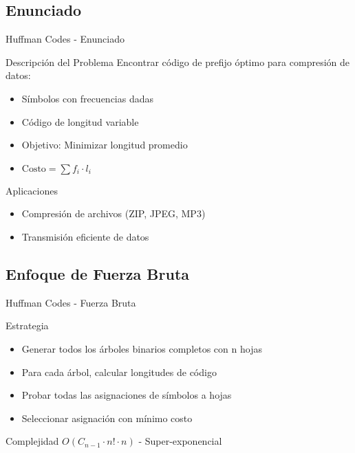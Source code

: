 \documentclass[aspectratio=169]{beamer}
\begin{document}
\subsection{Enunciado}
\begin{frame}{Huffman Codes - Enunciado}
\begin{block}{Descripción del Problema}
Encontrar código de prefijo óptimo para compresión de datos:
\begin{itemize}
\item Símbolos con frecuencias dadas
\item Código de longitud variable
\item Objetivo: Minimizar longitud promedio
\item $\text{Costo} = \sum f_i \cdot l_i$
\end{itemize}
\end{block}

\begin{exampleblock}{Aplicaciones}
\begin{itemize}
\item Compresión de archivos (ZIP, JPEG, MP3)
\item Transmisión eficiente de datos
\end{itemize}
\end{exampleblock}
\end{frame}

\subsection{Enfoque de Fuerza Bruta}
\begin{frame}{Huffman Codes - Fuerza Bruta}
\begin{block}{Estrategia}
\begin{itemize}
\item Generar todos los árboles binarios completos con n hojas
\item Para cada árbol, calcular longitudes de código
\item Probar todas las asignaciones de símbolos a hojas
\item Seleccionar asignación con mínimo costo
\end{itemize}
\end{block}

\begin{alertblock}{Complejidad}
$O(C_{n-1} \cdot n! \cdot n)$ - Super-exponencial
\end{alertblock}
\end{frame}
\end{document}
